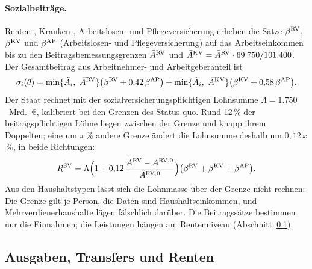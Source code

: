 \paragraph{Sozialbeiträge.} Renten-, Kranken-, Arbeitslosen- und
Pflegeversicherung erheben die Sätze $\beta^{\mathrm{RV}}$, $\beta^{\mathrm{KV}}$ und
$\beta^{\mathrm{AP}}$ (Arbeitslosen- und Pflegeversicherung) auf das
Arbeitseinkommen bis zu den Beitragsbemessungsgrenzen $\bar A^{\mathrm{RV}}$ und
$\bar A^{\mathrm{KV}} = \bar A^{\mathrm{RV}}\cdot 69.750/101.400$. Der Gesamtbeitrag aus
Arbeitnehmer- und Arbeitgeberanteil ist
\begin{equation}
  \sigma_i(\theta) = \min\{\tilde A_i,\ \bar A^{\mathrm{RV}}\}\bigl(\beta^{\mathrm{RV}} + 0{,}42\,\beta^{\mathrm{AP}}\bigr)
                   + \min\{\tilde A_i,\ \bar A^{\mathrm{KV}}\}\bigl(\beta^{\mathrm{KV}} + 0{,}58\,\beta^{\mathrm{AP}}\bigr).
\end{equation}
Der Staat rechnet mit der sozialversicherungspflichtigen Lohnsumme
$\Lambda = 1.750$~Mrd.~\euro{}, kalibriert bei den Grenzen des Status quo. Rund
12\,\% der beitragspflichtigen Löhne liegen zwischen der Grenze und knapp ihrem
Doppelten; eine um $x$\,\% andere Grenze ändert die Lohnsumme deshalb um
$0{,}12\,x$\,\%, in beide Richtungen:
\begin{equation}
  R^{\mathrm{SV}} = \Lambda\Bigl(1 + 0{,}12\,\frac{\bar A^{\mathrm{RV}} - \bar A^{\mathrm{RV},0}}{\bar A^{\mathrm{RV},0}}\Bigr)
              \bigl(\beta^{\mathrm{RV}} + \beta^{\mathrm{KV}} + \beta^{\mathrm{AP}}\bigr).
\end{equation}
Aus den Haushaltstypen lässt sich die Lohnmasse über der Grenze nicht rechnen: Die
Grenze gilt je Person, die Daten sind Haushaltseinkommen, und
Mehrverdienerhaushalte lägen fälschlich darüber. Die Beitragssätze bestimmen nur
die Einnahmen; die Leistungen hängen am Rentenniveau (Abschnitt~\ref{sec:ausgaben}).

\subsection{Ausgaben, Transfers und Renten}
\label{sec:ausgaben}

